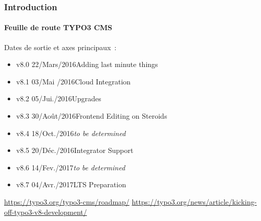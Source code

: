 \begin{frame}[fragile]
	\frametitle{Introduction}
	\framesubtitle{Feuille de route TYPO3 CMS}

	Dates de sortie et axes principaux~:

	\begin{itemize}

		\item v8.0 \tabto{1.1cm}22/Mars/2016\tabto{3.4cm}Adding last minute things
		\item v8.1 \tabto{1.1cm}03/Mai /2016\tabto{3.4cm}Cloud Integration
		\item
			\begingroup
				\color{typo3orange}
					v8.2 \tabto{1.1cm}05/Jui./2016\tabto{3.4cm}Upgrades
			\endgroup
		\item
			\begingroup
				\color{typo3orange}
					v8.3 \tabto{1.1cm}30/Août/2016\tabto{3.4cm}Frontend Editing on Steroids
			\endgroup
		\item v8.4 \tabto{1.1cm}18/Oct./2016\tabto{3.4cm}\textit{to be determined}
		\item v8.5 \tabto{1.1cm}20/Déc./2016\tabto{3.4cm}Integrator Support
		\item v8.6 \tabto{1.1cm}14/Fev./2017\tabto{3.4cm}\textit{to be determined}
		\item v8.7 \tabto{1.1cm}04/Avr./2017\tabto{3.4cm}LTS Preparation

	\end{itemize}

	\smaller
		\url{https://typo3.org/typo3-cms/roadmap/}\newline
		\url{https://typo3.org/news/article/kicking-off-typo3-v8-development/}
	\normalsize

\end{frame}

